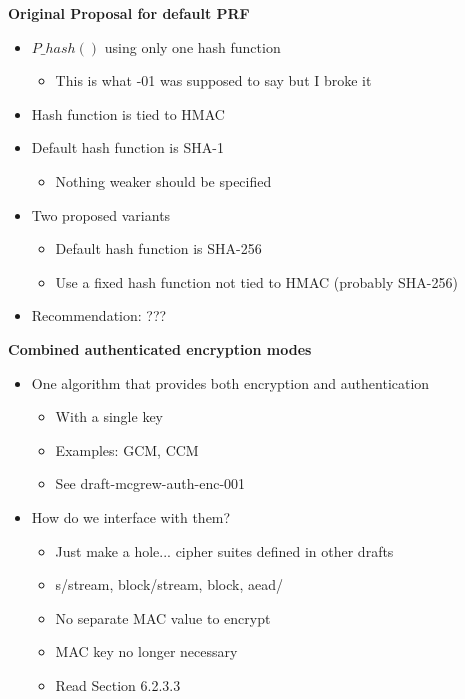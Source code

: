 \documentclass[fancybox]{seminar}
\newcommand{\heading}[1]{%
  \begin{center}
    \large\bf
    #1
  \end{center}
  \vspace{.4 in}}
\begin{document}
\begin{slide}
\heading{Original Proposal for default PRF}

\vspace{-.2 in}
\begin{itemize}
\item $P\_hash()$ using only one hash function
\begin{itemize}
\item This is what -01 was supposed to say but I broke it
\end{itemize}
\item Hash function is tied to HMAC
\item Default hash function is SHA-1
\begin{itemize}
\item Nothing weaker should be specified
\end{itemize}
\item Two proposed variants
\begin{itemize}
\item Default hash function is SHA-256
\item Use a fixed hash function not tied to HMAC (probably SHA-256)
\end{itemize}
\item Recommendation: ???
\end{itemize}
\end{slide}


\begin{slide}
\heading{Combined authenticated encryption modes}

\begin{itemize}
\item One algorithm that provides both encryption and authentication
\begin{itemize}
\item With a single key
\item Examples: GCM, CCM
\item See draft-mcgrew-auth-enc-001
\end{itemize}
\item How do we interface with them?
\begin{itemize}
\item Just make a hole... cipher suites defined in other drafts
\item s/stream, block/stream, block, aead/
\item No separate MAC value to encrypt
\item MAC key no longer necessary
\item Read Section 6.2.3.3
\end{itemize}
\end{itemize}
\end{slide}
\end{document}
